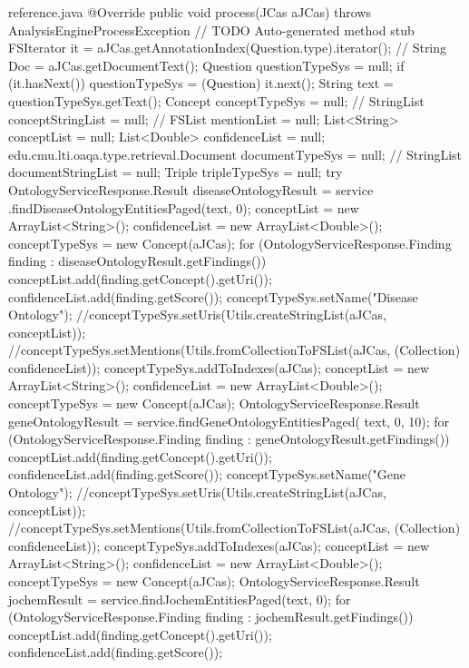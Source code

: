 \begin{chunk}{reference.java}
{  @Override
  public void process(JCas aJCas) throws AnalysisEngineProcessException {
    // TODO Auto-generated method stub
    FSIterator it = aJCas.getAnnotationIndex(Question.type).iterator();
    // String Doc = aJCas.getDocumentText();
    Question questionTypeSys = null;
    if (it.hasNext()) {
      questionTypeSys = (Question) it.next();
    }
    String text = questionTypeSys.getText();
    Concept conceptTypeSys = null;
    // StringList conceptStringList = null;
    // FSList mentionList = null;
    List<String> conceptList = null;
    List<Double> confidenceList = null;
    edu.cmu.lti.oaqa.type.retrieval.Document documentTypeSys = null;
    // StringList documentStringList = null;
    Triple tripleTypeSys = null;
    try {
      OntologyServiceResponse.Result diseaseOntologyResult = service
              .findDiseaseOntologyEntitiesPaged(text, 0);
      conceptList = new ArrayList<String>();
      confidenceList = new ArrayList<Double>();
      conceptTypeSys = new Concept(aJCas);
      for (OntologyServiceResponse.Finding finding : diseaseOntologyResult.getFindings()) {
        conceptList.add(finding.getConcept().getUri());
        confidenceList.add(finding.getScore());
      }
      conceptTypeSys.setName("Disease Ontology");
      //conceptTypeSys.setUris(Utils.createStringList(aJCas, conceptList));
      //conceptTypeSys.setMentions(Utils.fromCollectionToFSList(aJCas, (Collection) confidenceList));
      conceptTypeSys.addToIndexes(aJCas);
      conceptList = new ArrayList<String>();
      confidenceList = new ArrayList<Double>();
      conceptTypeSys = new Concept(aJCas);
      OntologyServiceResponse.Result geneOntologyResult = service.findGeneOntologyEntitiesPaged(
              text, 0, 10);
      for (OntologyServiceResponse.Finding finding : geneOntologyResult.getFindings()) {
        conceptList.add(finding.getConcept().getUri());
        confidenceList.add(finding.getScore());
      }
      conceptTypeSys.setName("Gene Ontology");
      //conceptTypeSys.setUris(Utils.createStringList(aJCas, conceptList));
      //conceptTypeSys.setMentions(Utils.fromCollectionToFSList(aJCas, (Collection) confidenceList));
      conceptTypeSys.addToIndexes(aJCas);
      conceptList = new ArrayList<String>();
      confidenceList = new ArrayList<Double>();
      conceptTypeSys = new Concept(aJCas);
      OntologyServiceResponse.Result jochemResult = service.findJochemEntitiesPaged(text, 0);
      for (OntologyServiceResponse.Finding finding : jochemResult.getFindings()) {
        conceptList.add(finding.getConcept().getUri());
        confidenceList.add(finding.getScore());
}}}}
\end{chunk}
